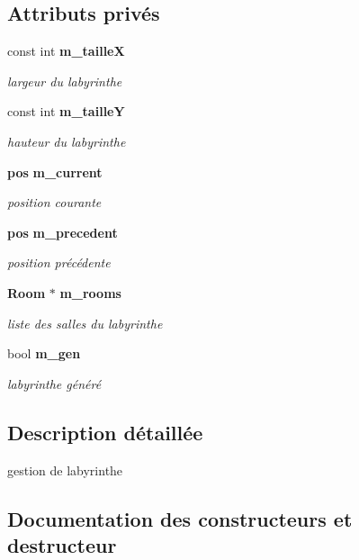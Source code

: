 \subsection*{Attributs privés}
\begin{DoxyCompactItemize}
\item 
const int {\bf m\-\_\-taille\-X}
\begin{DoxyCompactList}\small\item\em largeur du labyrinthe \end{DoxyCompactList}\item 
const int {\bf m\-\_\-taille\-Y}
\begin{DoxyCompactList}\small\item\em hauteur du labyrinthe \end{DoxyCompactList}\item 
{\bf pos} {\bf m\-\_\-current}
\begin{DoxyCompactList}\small\item\em position courante \end{DoxyCompactList}\item 
{\bf pos} {\bf m\-\_\-precedent}
\begin{DoxyCompactList}\small\item\em position précédente \end{DoxyCompactList}\item 
{\bf Room} $\ast$ {\bf m\-\_\-rooms}
\begin{DoxyCompactList}\small\item\em liste des salles du labyrinthe \end{DoxyCompactList}\item 
bool {\bf m\-\_\-gen}
\begin{DoxyCompactList}\small\item\em labyrinthe généré \end{DoxyCompactList}\end{DoxyCompactItemize}


\subsection{Description détaillée}
gestion de labyrinthe 

\subsection{Documentation des constructeurs et destructeur}
